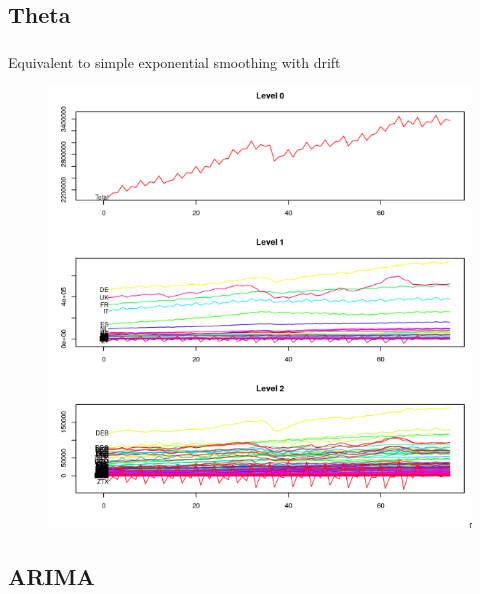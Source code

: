 \documentclass[c, dvipsnames]{beamer}  %
\begin{document}
\subsection{Theta}


\begin{frame}[shrink=5]
\frametitle{\insertsection} 
\framesubtitle{\insertsubsection}

Equivalent to simple exponential smoothing with drift

\begin{figure}
	\centering
	\includegraphics[width=0.7\linewidth]{screenshot034}
	\label{fig:screenshot029}
\end{figure}


\end{frame}

\subsection{ARIMA}
\end{document}
